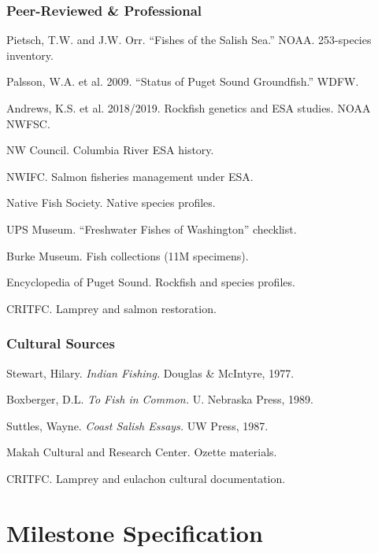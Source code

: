 \documentclass[11pt,letterpaper]{article}
\newcommand{\stageheader}[2]{\noindent\colorbox{#2}{\makebox[\textwidth][l]{\textcolor{white}{\bfseries\sffamily\hspace{6pt}#1\hspace{6pt}}}}\vspace{0.5em}\par}
\begin{document}
\subsubsection{Peer-Reviewed \& Professional}
\begin{enumerate}[leftmargin=2em, label={[P\arabic*]}]
\item Pietsch, T.W. and J.W. Orr. ``Fishes of the Salish Sea.'' NOAA. 253-species inventory.
\item Palsson, W.A. et al. 2009. ``Status of Puget Sound Groundfish.'' WDFW.
\item Andrews, K.S. et al. 2018/2019. Rockfish genetics and ESA studies. NOAA NWFSC.
\item NW Council. Columbia River ESA history.
\item NWIFC. Salmon fisheries management under ESA.
\item Native Fish Society. Native species profiles.
\item UPS Museum. ``Freshwater Fishes of Washington'' checklist.
\item Burke Museum. Fish collections (11M specimens).
\item Encyclopedia of Puget Sound. Rockfish and species profiles.
\item CRITFC. Lamprey and salmon restoration.
\end{enumerate}

\subsubsection{Cultural Sources}
\begin{enumerate}[leftmargin=2em, label={[C\arabic*]}]
\item Stewart, Hilary. \textit{Indian Fishing.} Douglas \& McIntyre, 1977.
\item Boxberger, D.L. \textit{To Fish in Common.} U. Nebraska Press, 1989.
\item Suttles, Wayne. \textit{Coast Salish Essays.} UW Press, 1987.
\item Makah Cultural and Research Center. Ozette materials.
\item CRITFC. Lamprey and eulachon cultural documentation.
\end{enumerate}

\newpage

\stageheader{STAGE 3 --- MISSION PACKAGE}{tertiary}

\section{Milestone Specification}
\end{document}
